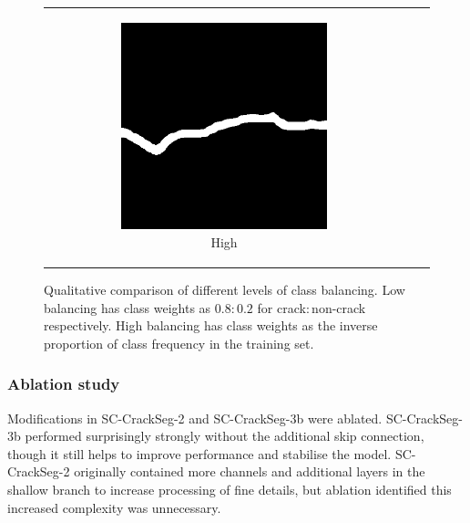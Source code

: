 \documentclass[a4paper,12pt]{report}
\begin{document}
\begin{figure}[htbp]
\begin{tabular}{ccc}
\begin{subfigure}[b]{0.3\textwidth}
        \end{subfigure}
        \begin{subfigure}[b]{0.3\textwidth}
            \centering
            \includegraphics[width=0.75\textwidth]{res/class-balancing-comparison/sc-crackseg-high}
            \caption{High}
            \label{fig:fig:crackseg-class-balancing-high}
        \end{subfigure}
    \end{tabular}
    \caption{Qualitative comparison of different levels of class balancing. Low balancing has class weights as $0.8:0.2$ for crack$:$non-crack respectively. High balancing has class weights as the inverse proportion of class frequency in the training set.}
\end{figure}

\subsubsection*{Ablation study}

Modifications in SC-CrackSeg-2 and SC-CrackSeg-3b were ablated. SC-CrackSeg-3b performed surprisingly strongly without the additional skip connection, though it still helps to improve performance and stabilise the model. SC-CrackSeg-2 originally contained more channels and additional layers in the shallow branch to increase processing of fine details, but ablation identified this increased complexity was unnecessary.
\end{document}
